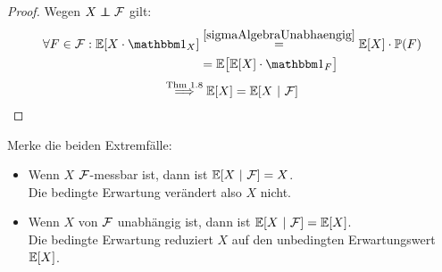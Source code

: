\begin{proof}
Wegen $X\unab\F$ gilt:
\begin{align*}
\forall F\in\F:\E[X\cdot\indi_X]
&\stackeq{\ref{sigmaAlgebraUnabhaengig}}
\E[X]\cdot\P(F)\\
&=\E\big[\E[X]\cdot\indi_F\big]
\end{align*}
\[\stackrel{\text{Thm 1.8}}{\Longrightarrow} \mathbb{E}[X]=\mathbb{E}[X~|~\mathcal{F}]\]
\end{proof}

\begin{bemerkung}
Merke die beiden Extremfälle:
\begin{itemize}
\item Wenn $X$ $\mathcal{F}$-messbar ist, dann ist $\mathbb{E}[X~|~\mathcal{F}]=X$.\\
Die bedingte Erwartung verändert also $X$ nicht.
\item Wenn $X$ von $\mathcal{F}$ unabhängig ist, dann ist $\mathbb{E}[X~|~\mathcal{F}]=\mathbb{E}[X]$.\\
Die bedingte Erwartung reduziert $X$ auf den unbedingten Erwartungswert $\mathbb{E}[X]$.
\end{itemize}
\end{bemerkung}
